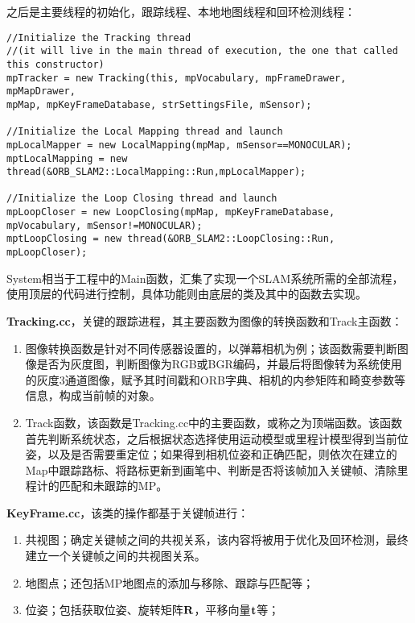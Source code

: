 之后是主要线程的初始化，跟踪线程、本地地图线程和回环检测线程：
\begin{verbatim}
//Initialize the Tracking thread
//(it will live in the main thread of execution, the one that called this constructor)
mpTracker = new Tracking(this, mpVocabulary, mpFrameDrawer, mpMapDrawer,
mpMap, mpKeyFrameDatabase, strSettingsFile, mSensor);

//Initialize the Local Mapping thread and launch
mpLocalMapper = new LocalMapping(mpMap, mSensor==MONOCULAR);
mptLocalMapping = new thread(&ORB_SLAM2::LocalMapping::Run,mpLocalMapper);

//Initialize the Loop Closing thread and launch
mpLoopCloser = new LoopClosing(mpMap, mpKeyFrameDatabase, mpVocabulary, mSensor!=MONOCULAR);
mptLoopClosing = new thread(&ORB_SLAM2::LoopClosing::Run, mpLoopCloser);
\end{verbatim}

System相当于工程中的Main函数，汇集了实现一个SLAM系统所需的全部流程，使用顶层的代码进行控制，具体功能则由底层的类及其中的函数去实现。

\textbf{Tracking.cc}，关键的跟踪进程，其主要函数为图像的转换函数和Track主函数：
\begin{enumerate}
	\item 
	图像转换函数是针对不同传感器设置的，以弹幕相机为例；该函数需要判断图像是否为灰度图，判断图像为RGB或BGR编码，并最后将图像转为系统使用的灰度3通道图像，赋予其时间戳和ORB字典、相机的内参矩阵和畸变参数等信息，构成当前帧的对象。
	\item 
	Track函数，该函数是Tracking.cc中的主要函数，或称之为顶端函数。该函数首先判断系统状态，之后根据状态选择使用运动模型或里程计模型得到当前位姿，以及是否需要重定位；如果得到相机位姿和正确匹配，则依次在建立的Map中跟踪路标、将路标更新到画笔中、判断是否将该帧加入关键帧、清除里程计的匹配和未跟踪的MP。
\end{enumerate}

\textbf{KeyFrame.cc}，该类的操作都基于关键帧进行：

\begin{enumerate}
	\item 
	共视图；确定关键帧之间的共视关系，该内容将被用于优化及回环检测，最终建立一个关键帧之间的共视图关系。
	\item 
	地图点；还包括MP地图点的添加与移除、跟踪与匹配等；
	\item 
	位姿；包括获取位姿、旋转矩阵$\bf{R}$，平移向量$\bf{t}$等；
\end{enumerate}

